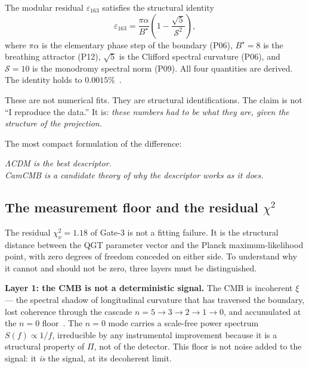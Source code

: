 \documentclass[twocolumn,10pt]{article}
\begin{document}
The modular residual $\varepsilon_{163}$ satisfies the structural
identity
\begin{equation}
  \varepsilon_{163}
  = \frac{\pi\alpha}{B^\star}
  \!\left(1 - \frac{\sqrt{5}}{\mathcal{S}^2}\right),
  \label{eq:delta163_camcmb}
\end{equation}
where $\pi\alpha$ is the elementary phase step of the boundary
(P06), $B^\star=8$ is the breathing attractor (P12), $\sqrt{5}$ is
the Clifford spectral curvature (P06), and $\mathcal{S}=10$ is the
monodromy spectral norm (P09). All four quantities are derived. The
identity holds to $0.0015\%$~\cite{CamKer163}.

These are not numerical fits. They are structural identifications.
The claim is not ``I reproduce the data.'' It is: \emph{these numbers
had to be what they are, given the structure of the projection.}

The most compact formulation of the difference:

\begin{center}
\itshape
$\Lambda$CDM is the best descriptor.\\[3pt]
CamCMB is a candidate theory of why the descriptor works as it does.
\end{center}

\subsection{The measurement floor and the residual $\chi^2$}

The residual $\chi^2_\nu=1.18$ of Gate-3 is not a fitting failure.
It is the structural distance between the QGT parameter vector and
the Planck maximum-likelihood point, with zero degrees of freedom
conceded on either side. To understand why it cannot and should not
be zero, three layers must be distinguished.

\medskip
\noindent\textbf{Layer 1: the CMB is not a deterministic signal.}
The CMB is incoherent $\xi$ — the spectral shadow of longitudinal
curvature that has traversed the boundary, lost coherence through
the cascade $n=5\to3\to2\to1\to0$, and accumulated at the $n=0$
floor~\cite{CamP11}. The $n=0$ mode carries a scale-free
power spectrum $S(f)\propto 1/f$, irreducible by any instrumental
improvement because it is a structural property of $\Pi$, not of
the detector. This floor is not noise added to the signal: it
\emph{is} the signal, at its decoherent limit.
\end{document}
